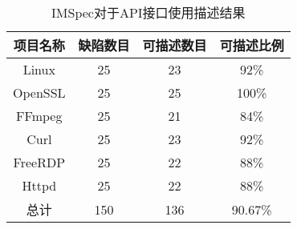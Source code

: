 \begin{table}[t]
	\centering
	\begin{minipage}[t]{0.6\linewidth} %
		\caption{IMSpec对于API接口使用描述结果}
		\label{tab:2-5-description}
			\begin{tabular}{cccc}
			\hline
			项目名称 & 缺陷数目 & 可描述数目 & 可描述比例 \\
			\hline
			Linux & 25 & 23 & 92\% \\
			OpenSSL & 25 & 25 & 100\% \\
			FFmpeg & 25 & 21 & 84\% \\
			Curl & 25 & 23 & 92\% \\
			FreeRDP & 25 & 22 & 88\% \\
			Httpd & 25 & 22 & 88\% \\
			\hline
			总计 & 150 & 136 & 90.67\% \\
			\hline
		\end{tabular}
	\end{minipage}
\end{table}